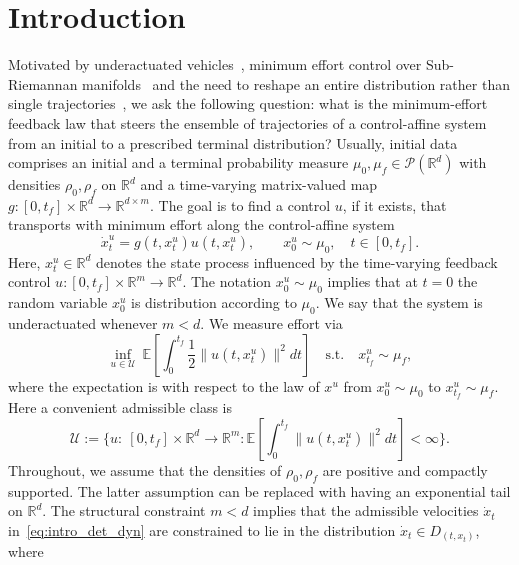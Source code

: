 \documentclass{amsart}
\numberwithin{equation}{section}
\newcommand{\R}{\mathbb{R}}
\newcommand{\map}[3]{#1:#2 \rightarrow #3}
\newcommand{\E}{\mathbb{E}}
\begin{document}
\section{Introduction}\label{sec:intro}
Motivated by underactuated vehicles~\cite{murray2017mathematical,lee2010geometric}, minimum effort control over Sub-Riemannan manifolds~\cite{tiwariJena2020optimal,tiwari2022optimal,halder2021sub} and the need to reshape an entire distribution rather than single trajectories~\cite{brockett2007optimal,agrachev2009optimal,chen2021optimal,adu2024schrodinger,hindawi2011mass}, we ask the following question: what is the minimum-effort feedback law that steers the ensemble of trajectories of a control-affine system from an initial to a prescribed terminal distribution? Usually, initial data comprises an initial and a terminal probability measure $\mu_0,\mu_f\in\mathcal{P}(\mathbb{R}^d)$ with densities $\rho_0,\rho_f$ on $\mathbb{R}^d$ and a time-varying matrix-valued map $\map{g}{[0,t_f]\times\mathbb{R}^d}{\mathbb{R}^{d\times m}}$. The goal is to find a control $u$, if it exists, that transports with minimum effort along the control-affine system
\begin{equation}\label{eq:intro_det_dyn}
  \dot{x}_t^u  =  g(t, x_t^u)u(t, x_t^u), \qquad  x_0^u \sim \mu_0,\quad t\in[0,t_f].
\end{equation}
Here, $x^u_t\in\mathbb{R}^{d}$ denotes the state process influenced by the time-varying feedback control $\map{u}{[0,t_f]\times\mathbb{R}^m}{\mathbb{R}^{d}}$. The notation $x_0^u \sim \mu_0$ implies that at $t=0$ the random variable $x_0^u$ is distribution according to $\mu_0$. We say that the system is underactuated whenever $m<d$. We measure effort via %
\begin{equation}\label{eq:intro_det_obj}
  \inf_{u\in\mathcal U}\ \E \left[\int_{0}^{t_f}\frac12 \|u(t, x_t^u)\|^2 dt\right]
  \quad\text{s.t.}\quad  x_{t_f}^u\sim\mu_f,
\end{equation}
where the expectation is with respect to the law of $x^u$ from $ x_0^u\sim\mu_0$ to $x_{t_f}^u\sim\mu_f$. Here a convenient admissible class is 
$$\mathcal U:=\Big\{u:\ [0,t_f]\times\mathbb{R}^d\to\mathbb{R}^m:
\E \left[\int_0^{t_f}\|u(t, x_t^u)\|^2 dt\right]<\infty\Big\}.$$
Throughout, we assume that the densities of $\rho_0,\rho_f$ are positive and compactly supported. The latter assumption can be replaced with having an exponential tail on $\R^d$. The structural constraint $m<d$ implies that the admissible velocities $\dot{x}_t$ in~\eqref{eq:intro_det_dyn} are constrained to lie in the distribution $\dot{x}_t\in D_{(t,x_t)}$, where
\end{document}
